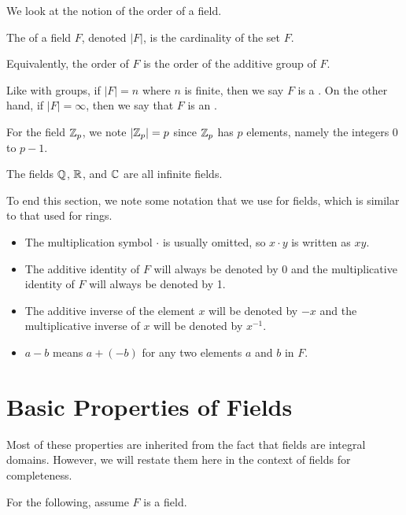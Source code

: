 We look at the notion of the order of a field.
\begin{definition}
    The  of a field $F$, denoted $|F|$, is the cardinality of the set $F$.
\end{definition}
\begin{remark}
    Equivalently, the order of $F$ is the order of the additive group of $F$.
\end{remark}

Like with groups, if $|F| = n$ where $n$ is finite, then we say $F$ is a . On the other hand, if $|F| = \infty$, then we say that $F$ is an .

\begin{example}
    For the field $\mathbb{Z}_p$, we note $|\mathbb{Z}_p| = p$ since $\mathbb{Z}_p$ has $p$ elements, namely the integers 0 to $p - 1$.
\end{example}
\begin{example}
    The fields $\mathbb{Q}$, $\mathbb{R}$, and $\mathbb{C}$ are all infinite fields.
\end{example}

To end this section, we note some notation that we use for fields, which is similar to that used for rings.
\begin{itemize}
    \item The multiplication symbol $\cdot$ is usually omitted, so $x \cdot y$ is written as $xy$.
    \item The additive identity of $F$ will always be denoted by 0 and the multiplicative identity of $F$ will always be denoted by 1.
    \item The additive inverse of the element $x$ will be denoted by $-x$ and the multiplicative inverse of $x$ will be denoted by $x^{-1}$.
    \item $a - b$ means $a + (-b)$ for any two elements $a$ and $b$ in $F$.
\end{itemize}

\newpage

\section{Basic Properties of Fields}
Most of these properties are inherited from the fact that fields are integral domains. However, we will restate them here in the context of fields for completeness.

For the following, assume $F$ is a field.

